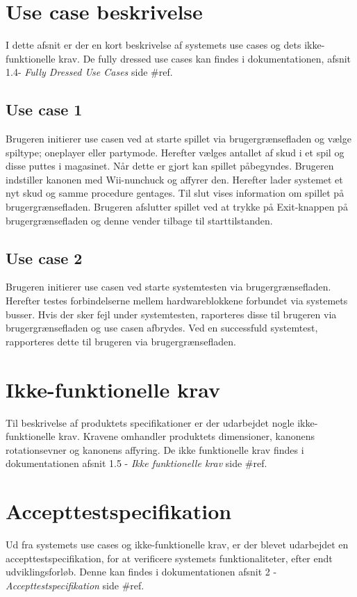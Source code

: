 \newpage
\section{Use case beskrivelse}
I dette afsnit er der en kort beskrivelse af systemets use cases og dets ikke-funktionelle krav. De fully dressed use cases kan findes i dokumentationen, afsnit 1.4- \textit{Fully Dressed Use Cases} side \#ref.

\subsection{Use case 1}
Brugeren initierer use casen ved at starte spillet via brugergrænsefladen og vælge spiltype; oneplayer eller partymode. Herefter vælges antallet af skud i et spil og disse puttes i magasinet. Når dette er gjort kan spillet påbegyndes. Brugeren indstiller kanonen med Wii-nunchuck og affyrer den. Herefter lader systemet et nyt skud og samme procedure gentages. Til slut vises information om spillet på brugergrænsefladen. Brugeren afslutter spillet ved at trykke på Exit-knappen på brugergrænsefladen og denne vender tilbage til starttilstanden. 

\subsection{Use case 2}
Brugeren initierer use casen ved starte systemtesten via brugergrænsefladen. Herefter testes forbindelserne mellem hardwareblokkene forbundet via systemets busser. Hvis der sker fejl under systemtesten, raporteres disse til brugeren via brugergrænsefladen og use casen afbrydes. Ved en successfuld systemtest, rapporteres dette til brugeren via brugergrænsefladen.

\section{Ikke-funktionelle krav}
Til beskrivelse af produktets specifikationer er der udarbejdet nogle ikke-funktionelle krav. Kravene omhandler produktets dimensioner, kanonens rotationsevner og kanonens affyring. De ikke funktionelle krav findes i dokumentationen afsnit 1.5 - \textit{Ikke funktionelle krav} side \#ref.

\section{Accepttestspecifikation}
Ud fra systemets use cases og ikke-funktionelle krav, er der blevet udarbejdet en accepttestspecifikation, for at verificere systemets funktionaliteter, efter endt udviklingsforløb. Denne kan findes i dokumentationen afsnit 2 - \textit{Accepttestspecifikation} side \#ref. 